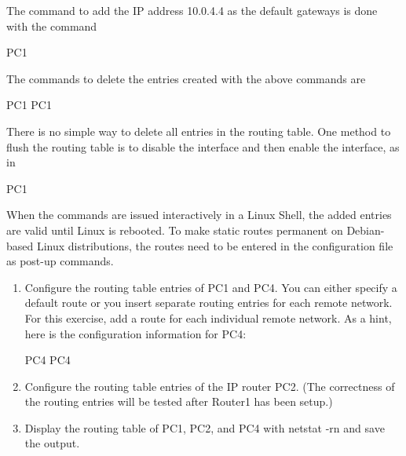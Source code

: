 The command to add the IP address 10.0.4.4 as the default gateways is done with the command
\begin{cmdblock}
	PC1%
\end{cmdblock}

The commands to delete the entries created with the above commands are
\begin{cmdblock}
	PC1%
	PC1%
\end{cmdblock}

There is no simple way to delete all entries in the routing table. One method to flush the routing table is to disable the interface and then enable the interface, as in
\begin{cmdblock}
	PC1%
\end{cmdblock}


When the commands are issued interactively in a Linux Shell, the added entries are valid until Linux is rebooted. To make static routes permanent on Debian-based Linux distributions, the routes need to be entered in the configuration file  as post-up commands.

\begin{enumerate}
	\item  Configure the routing table entries of PC1 and PC4. You can either specify a default route or you insert separate routing entries for each remote network. For this exercise, add a route for each individual remote network. As a hint, here is the configuration information for PC4:
		\begin{cmdblock}
	PC4%
	PC4%
		\end{cmdblock}
	\item Configure the routing table entries of the IP router PC2. (The correctness of the routing entries will be tested after Router1 has been setup.)
	\item Display the routing table of PC1, PC2, and PC4 with netstat -rn and save the output.
\end{enumerate}


